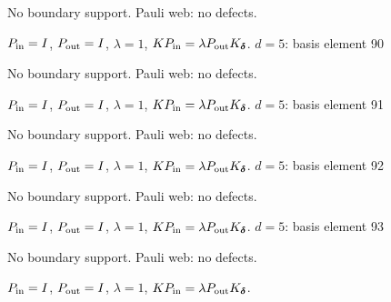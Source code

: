 No boundary support. Pauli web: no defects.
\begin{center}
\end{center}
\vspace{-1mm}
$P_{\rm in}=I$, \quad $P_{\rm out}=I$, \quad $\lambda=1$, \qquad $K P_{\rm in}=\lambda P_{\rm out}K_{\boldsymbol\delta}$.
\vfill
{\footnotesize\texttt{}}
\newpage
{}
{\Large $d=5$: basis element 90}\par
No boundary support. Pauli web: no defects.
\begin{center}
\end{center}
\vspace{-1mm}
$P_{\rm in}=I$, \quad $P_{\rm out}=I$, \quad $\lambda=1$, \qquad $K P_{\rm in}=\lambda P_{\rm out}K_{\boldsymbol\delta}$.
\vfill
{\footnotesize\texttt{}}
\newpage
{}
{\Large $d=5$: basis element 91}\par
No boundary support. Pauli web: no defects.
\begin{center}
\end{center}
\vspace{-1mm}
$P_{\rm in}=I$, \quad $P_{\rm out}=I$, \quad $\lambda=1$, \qquad $K P_{\rm in}=\lambda P_{\rm out}K_{\boldsymbol\delta}$.
\vfill
{\footnotesize\texttt{}}
\newpage
{}
{\Large $d=5$: basis element 92}\par
No boundary support. Pauli web: no defects.
\begin{center}
\end{center}
\vspace{-1mm}
$P_{\rm in}=I$, \quad $P_{\rm out}=I$, \quad $\lambda=1$, \qquad $K P_{\rm in}=\lambda P_{\rm out}K_{\boldsymbol\delta}$.
\vfill
{\footnotesize\texttt{}}
\newpage
{}
{\Large $d=5$: basis element 93}\par
No boundary support. Pauli web: no defects.
\begin{center}
\end{center}
\vspace{-1mm}
$P_{\rm in}=I$, \quad $P_{\rm out}=I$, \quad $\lambda=1$, \qquad $K P_{\rm in}=\lambda P_{\rm out}K_{\boldsymbol\delta}$.

